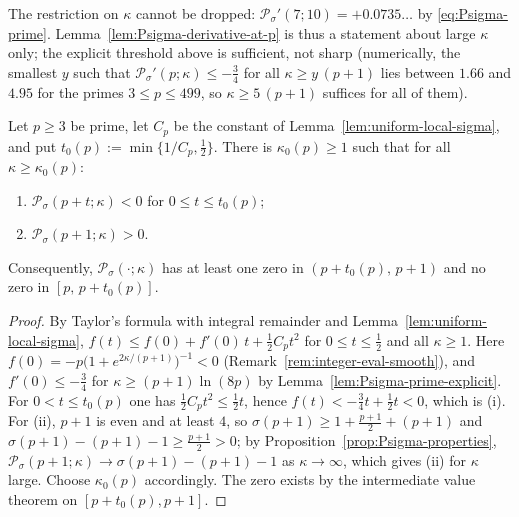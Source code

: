 \begin{remark}
The restriction on $\kappa$ cannot be dropped: $\mathcal P_\sigma'(7;10)=+0.0735\ldots$ by \eqref{eq:Psigma-prime}. Lemma~\ref{lem:Psigma-derivative-at-p} is thus a statement about large $\kappa$ only; the explicit threshold above is sufficient, not sharp (numerically, the smallest $y$ such that $\mathcal P_\sigma'(p;\kappa)\le-\tfrac34$ for all $\kappa\ge y\,(p+1)$ lies between $1.66$ and $4.95$ for the primes $3\le p\le 499$, so $\kappa\ge5\,(p+1)$ suffices for all of them).
\end{remark}

\begin{proposition}\label{prop:Psigma-right-fixed}
Let $p\ge3$ be prime, let $C_p$ be the constant of Lemma~\ref{lem:uniform-local-sigma}, and put $t_0(p):=\min\{1/C_p,\tfrac12\}$. There is $\kappa_0(p)\ge1$ such that for all $\kappa\ge\kappa_0(p)$:
\begin{enumerate}
\item[(i)] $\mathcal P_\sigma(p+t;\kappa)<0$ for $0\le t\le t_0(p)$;
\item[(ii)] $\mathcal P_\sigma(p+1;\kappa)>0$.
\end{enumerate}
Consequently, $\mathcal P_\sigma(\cdot;\kappa)$ has at least one zero in $(p+t_0(p),\,p+1)$ and no zero in $[p,\,p+t_0(p)]$.
\end{proposition}

\begin{proof}
By Taylor's formula with integral remainder and Lemma~\ref{lem:uniform-local-sigma}, $f(t)\le f(0)+f'(0)\,t+\tfrac12C_pt^2$ for $0\le t\le\tfrac12$ and all $\kappa\ge1$. Here $f(0)=-p\bigl(1+e^{2\kappa/(p+1)}\bigr)^{-1}<0$ (Remark~\ref{rem:integer-eval-smooth}), and $f'(0)\le-\tfrac34$ for $\kappa\ge(p+1)\ln(8p)$ by Lemma~\ref{lem:Psigma-prime-explicit}. For $0<t\le t_0(p)$ one has $\tfrac12C_pt^2\le\tfrac12t$, hence $f(t)<-\tfrac34t+\tfrac12t<0$, which is (i). For (ii), $p+1$ is even and at least $4$, so $\sigma(p+1)\ge1+\tfrac{p+1}{2}+(p+1)$ and $\sigma(p+1)-(p+1)-1\ge\tfrac{p+1}{2}>0$; by Proposition~\ref{prop:Psigma-properties}, $\mathcal P_\sigma(p+1;\kappa)\to\sigma(p+1)-(p+1)-1$ as $\kappa\to\infty$, which gives (ii) for $\kappa$ large. Choose $\kappa_0(p)$ accordingly. The zero exists by the intermediate value theorem on $[p+t_0(p),p+1]$.
\end{proof}

